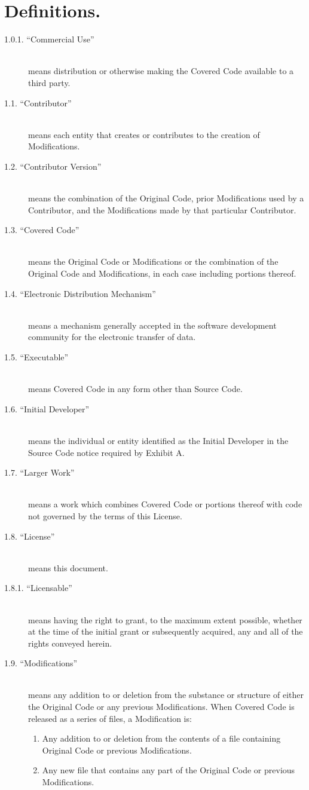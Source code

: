 \documentclass[letterpaper,colorlinks=true,linkcolor=blue]{book}
\begin{document}
\section{Definitions.}
\begin{description}
\item [1.0.1. ``Commercial Use'']\mbox{}\\
means distribution or otherwise making the Covered Code available to a third party. 
\item [1.1. ``Contributor'']\mbox{}\\
means each entity that creates or contributes to the creation of Modifications. 
\item [1.2. ``Contributor Version'']\mbox{}\\
means the combination of the Original Code, prior Modifications used by a Contributor, and the Modifications made by that particular Contributor. 
\item [1.3. ``Covered Code'']\mbox{}\\
means the Original Code or Modifications or the combination of the Original Code and Modifications, in each case including portions thereof. 
\item [1.4. ``Electronic Distribution Mechanism'']\mbox{}\\
means a mechanism generally accepted in the software development community for the electronic transfer of data. 
\item [1.5. ``Executable'']\mbox{}\\
means Covered Code in any form other than Source Code. 
\item [1.6. ``Initial Developer'']\mbox{}\\
means the individual or entity identified as the Initial Developer in the Source Code notice required by Exhibit A. 
\item [1.7. ``Larger Work'']\mbox{}\\
means a work which combines Covered Code or portions thereof with code not governed by the terms of this License. 
\item [1.8. ``License'']\mbox{}\\
means this document. 
\item [1.8.1. ``Licensable'']\mbox{}\\
means having the right to grant, to the maximum extent possible, whether at the time of the initial grant or subsequently acquired, any and all of the rights conveyed herein. 
\item [1.9. ``Modifications'']\mbox{}\\
means any addition to or deletion from the substance or structure of either the Original Code or any previous Modifications. When Covered Code is released as a series of files, a Modification is: 
\renewcommand{\theenumi}{\alph{enumi}}
\begin{enumerate}
\item Any addition to or deletion from the contents of a file containing Original Code or previous Modifications. 
\item Any new file that contains any part of the Original Code or previous Modifications. 
\end{enumerate}


\end{description}
\end{document}
